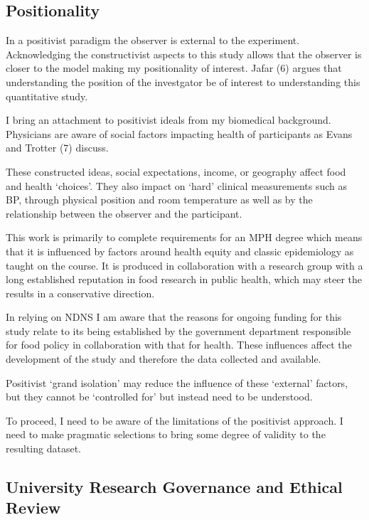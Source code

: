 \documentclass[
]{article}
\begin{document}
\hypertarget{positionality}{%
\subsection{Positionality}\label{positionality}}

In a positivist paradigm the observer is external to the experiment.
Acknowledging the constructivist aspects to this study allows that the
observer is closer to the model making my positionality of interest.
Jafar (6) argues that understanding the position of the investgator be
of interest to understanding this quantitative study.

I bring an attachment to positivist ideals from my biomedical
background. Physicians are aware of social factors impacting health of
participants as Evans and Trotter (7) discuss.

These constructed ideas, social expectations, income, or geography
affect food and health `choices'. They also impact on `hard' clinical
measurements such as BP, through physical position and room temperature
as well as by the relationship between the observer and the participant.

This work is primarily to complete requirements for an MPH degree which
means that it is influenced by factors around health equity and classic
epidemiology as taught on the course. It is produced in collaboration
with a research group with a long established reputation in food
research in public health, which may steer the results in a conservative
direction.

In relying on NDNS I am aware that the reasons for ongoing funding for
this study relate to its being established by the government department
responsible for food policy in collaboration with that for health. These
influences affect the development of the study and therefore the data
collected and available.

Positivist `grand isolation' may reduce the influence of these
`external' factors, but they cannot be `controlled for' but instead need
to be understood.

To proceed, I need to be aware of the limitations of the positivist
approach. I need to make pragmatic selections to bring some degree of
validity to the resulting dataset.

\hypertarget{university-research-governance-and-ethical-review}{%
\subsection{University Research Governance and Ethical
Review}\label{university-research-governance-and-ethical-review}}
\end{document}
